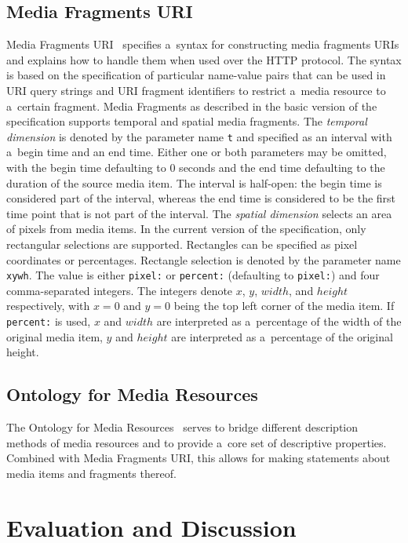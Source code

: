 \documentclass{sig-alternate}
\begin{document}
\subsection{Media Fragments URI}

Media Fragments URI~\cite{troncy2012mediafragments}
specifies a~syntax for constructing media fragments URIs
and explains how to handle them when used over the HTTP protocol.
The syntax is based on the specification of
particular name-value pairs that can be used in URI query strings
and URI fragment identifiers to restrict a~media resource
to a~certain fragment.
Media Fragments as described in the basic version
of the specification supports temporal and spatial media fragments.
The \emph{temporal dimension} is denoted
by the parameter name \texttt{t} and specified as an interval
with a~begin time and an end time.
Either one or both parameters may be omitted,
with the begin time defaulting to 0 seconds
and the end time defaulting to the duration of the source media item.
The interval is half-open: the begin time is considered
part of the interval, whereas the end time is considered
to be the first time point that is not part of the interval.
The \emph{spatial dimension} selects
an area of pixels from media items.
In the current version of the specification,
only rectangular selections are supported.
Rectangles can be specified as pixel coordinates or percentages.
Rectangle selection is denoted by the parameter name \texttt{xywh}.
The value is either \texttt{pixel:} or \texttt{percent:}
(defaulting to \texttt{pixel:}) and four comma-separated integers.
The integers denote $x$, $y$, $width$, and $height$ respectively,
with $x = 0$ and $y = 0$ being the top left corner of the media item.
If \texttt{percent:} is used, $x$ and $width$ are interpreted
as a~percentage of the width of the original media item,
$y$ and $height$ are interpreted as a~percentage
of the original height.

\subsection{Ontology for Media Resources}

The Ontology for Media Resources~\cite{lee2012mediaontology}
serves to bridge different description methods of media resources
and to provide a~core set of descriptive properties.
Combined with Media Fragments URI,
this allows for making statements about media items
and fragments thereof.
  
\section{Evaluation and Discussion}
\end{document}
